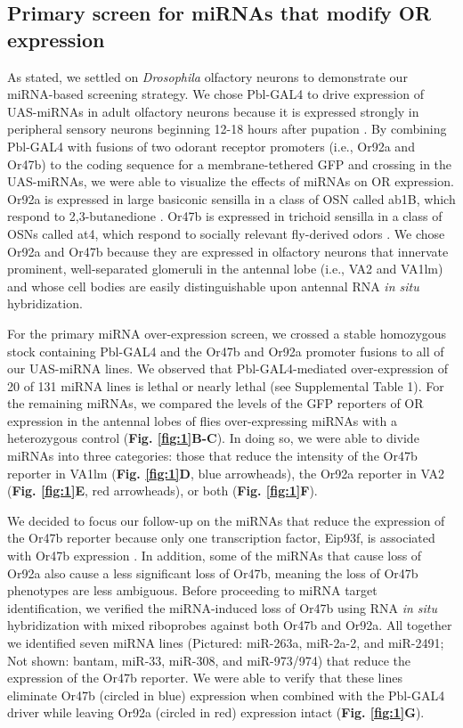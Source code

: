 \subsection*{Primary screen for miRNAs that modify OR expression}

As stated, we settled on \emph{Drosophila} olfactory neurons to demonstrate our miRNA-based screening strategy.
We chose Pbl-GAL4 to drive expression of UAS-miRNAs in adult olfactory neurons because it is expressed strongly in peripheral sensory neurons beginning 12-18 hours after pupation \cite{dnik_Dickson_Luo_Komiyama_2007}.
By combining Pbl-GAL4 with fusions of two odorant receptor promoters (i.e., Or92a and Or47b) to the coding sequence for a membrane-tethered GFP and crossing in the UAS-miRNAs, we were able to visualize the effects of miRNAs on OR expression.
Or92a is expressed in large basiconic sensilla in a class of OSN called ab1B, which respond to 2,3-butanedione \cite{de_Bruyne_Foster_Carlson_2001}.
Or47b is expressed in trichoid sensilla in a class of OSNs called at4, which respond to socially relevant fly-derived odors \cite{vanderGoesvanNaters:2007cq}.
We chose Or92a and Or47b because they are expressed in olfactory neurons that innervate prominent, well-separated glomeruli in the antennal lobe (i.e., VA2 and VA1lm) and whose cell bodies are easily distinguishable upon antennal RNA \emph{in situ} hybridization.

For the primary miRNA over-expression screen, we crossed a stable homozygous stock containing Pbl-GAL4 and the Or47b and Or92a promoter fusions to all of our UAS-miRNA lines.
We observed that Pbl-GAL4-mediated over-expression of 20 of 131 miRNA lines is lethal or nearly lethal (see Supplemental Table 1).
For the remaining miRNAs, we compared the levels of the GFP reporters of OR expression in the antennal lobes of flies over-expressing miRNAs with a heterozygous control (\textbf{Fig. \ref{fig:1}B-C}).
In doing so, we were able to divide miRNAs into three categories: those that reduce the intensity of the Or47b reporter in VA1lm (\textbf{Fig. \ref{fig:1}D}, blue arrowheads), the Or92a reporter in VA2 (\textbf{Fig. \ref{fig:1}E}, red arrowheads), or both (\textbf{Fig. \ref{fig:1}F}).

We decided to focus our follow-up on the miRNAs that reduce the expression of the Or47b reporter because only one transcription factor, Eip93f, is associated with Or47b expression \cite{Brochtrup_Hummel_Alenius_2012}.
In addition, some of the miRNAs that cause loss of Or92a also cause a less significant loss of Or47b, meaning the loss of Or47b phenotypes are less ambiguous.
Before proceeding to miRNA target identification, we verified the miRNA-induced loss of Or47b using RNA \emph{in situ} hybridization with mixed riboprobes against both Or47b and Or92a.
All together we identified seven miRNA lines (Pictured: miR-263a, miR-2a-2, and miR-2491; Not shown: bantam, miR-33, miR-308, and miR-973/974) that reduce the expression of the Or47b reporter.
We were able to verify that these lines eliminate Or47b (circled in blue) expression when combined with the Pbl-GAL4 driver while leaving Or92a (circled in red) expression intact (\textbf{Fig. \ref{fig:1}G}).
